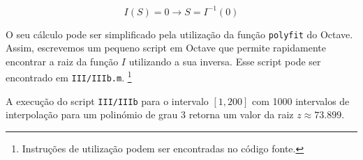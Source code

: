 \documentclass[portuguese, a4paper]{article}
\newcommand\tu[0]{\textunderscore}
\begin{document}
		\begin{equation}
			I(S) = 0 \rightarrow S = I^{-1}(0)
		\end{equation}

		\par
		O seu cálculo pode ser simplificado pela utilização da função
		\texttt{polyfit} do Octave.  Assim, escrevemos um pequeno script em
		Octave que permite rapidamente encontrar a raiz da função $I$
		utilizando a sua inversa. Esse script pode ser encontrado em
		\texttt{III/III\tu b.m}. \footnote{Instruções de utilização podem ser
		encontradas no código fonte.}

		\par
		A execução do script \texttt{III/III\tu b} para o intervalo $[1, 200]$
		com 1000 intervalos de interpolação para um polinómio de grau 3 retorna
		um valor da raiz $z \approx 73.899$.





\end{document}
